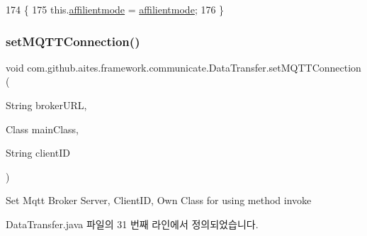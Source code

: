 \begin{DoxyCode}
174                                                        \{
175         this.\mbox{\hyperlink{classcom_1_1github_1_1aites_1_1framework_1_1communicate_1_1_data_transfer_a15377742659a03248cb9cbdd4f691386}{affilientmode}} = \mbox{\hyperlink{classcom_1_1github_1_1aites_1_1framework_1_1communicate_1_1_data_transfer_a15377742659a03248cb9cbdd4f691386}{affilientmode}};
176     \}
\end{DoxyCode}
\mbox{\label{classcom_1_1github_1_1aites_1_1framework_1_1communicate_1_1_data_transfer_a7885fd92b18891995e9030d238a06ff4}} 
\subsubsection{\texorpdfstring{set\+M\+Q\+T\+T\+Connection()}{setMQTTConnection()}}
{\footnotesize\ttfamily void com.\+github.\+aites.\+framework.\+communicate.\+Data\+Transfer.\+set\+M\+Q\+T\+T\+Connection (\begin{DoxyParamCaption}\item[{String}]{broker\+U\+RL,  }\item[{Class}]{main\+Class,  }\item[{String}]{client\+ID }\end{DoxyParamCaption})}



Set Mqtt Broker Server, Client\+ID, Own Class for using method invoke 



Data\+Transfer.\+java 파일의 31 번째 라인에서 정의되었습니다.


